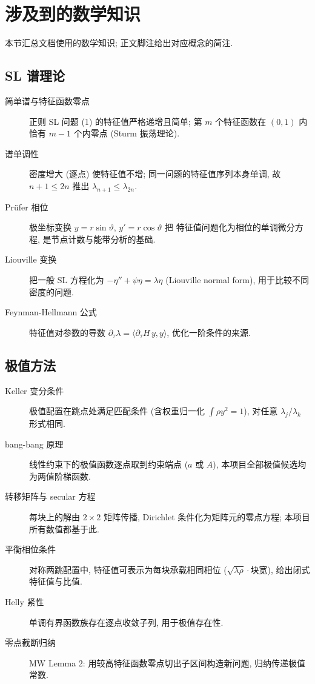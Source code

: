 \documentclass[UTF8]{ctexart}
\begin{document}
\section{涉及到的数学知识}

本节汇总文档使用的数学知识; 正文脚注给出对应概念的简注.

\subsection{SL 谱理论}

\begin{description}
	\item[简单谱与特征函数零点] 正则 SL 问题 (1) 的特征值严格递增且简单;
		第 $m$ 个特征函数在 $(0,1)$ 内恰有 $m-1$ 个内零点 (Sturm 振荡理论).
	\item[谱单调性] 密度增大 (逐点) 使特征值不增; 同一问题的特征值序列本身单调,
		故 $n+1 \leq 2n$ 推出 $\lambda_{n+1} \leq \lambda_{2n}$.
	\item[Pr\"ufer 相位] 极坐标变换 $y = r\sin\vartheta$, $y' = r\cos\vartheta$ 把
		特征值问题化为相位的单调微分方程, 是节点计数与能带分析的基础.
	\item[Liouville 变换] 把一般 SL 方程化为 $-\eta'' + \psi\eta = \lambda\eta$
		(Liouville normal form), 用于比较不同密度的问题.
	\item[Feynman-Hellmann 公式] 特征值对参数的导数 $\partial_\tau \lambda = \langle \partial_\tau H \, y, y\rangle$,
		优化一阶条件的来源.
\end{description}

\subsection{极值方法}

\begin{description}
	\item[Keller 变分条件] 极值配置在跳点处满足匹配条件 (含权重归一化
		$\int \rho y^2 = 1$), 对任意 $\lambda_j/\lambda_k$ 形式相同.
	\item[bang-bang 原理] 线性约束下的极值函数逐点取到约束端点 ($a$ 或 $A$),
		本项目全部极值候选均为两值阶梯函数.
	\item[转移矩阵与 secular 方程] 每块上的解由 $2\times 2$ 矩阵传播,
		Dirichlet 条件化为矩阵元的零点方程; 本项目所有数值都基于此.
	\item[平衡相位条件] 对称两跳配置中, 特征值可表示为每块承载相同相位
		($\sqrt{\lambda\rho}\cdot\text{块宽}$), 给出闭式特征值与比值.
	\item[Helly 紧性] 单调有界函数族存在逐点收敛子列, 用于极值存在性.
	\item[零点截断归纳] MW Lemma 2: 用较高特征函数零点切出子区间构造新问题,
		归纳传递极值常数.
\end{description}
\end{document}
